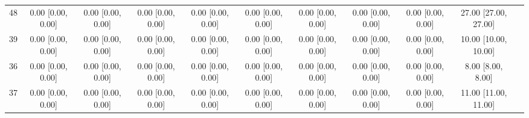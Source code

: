 \documentclass[8pt]{article}
\begin{document}
\begin{center}
\begin{footnotesize}
\begin{longtable}{|ccccccccccc|}
 48 &  0.00 [0.00, 0.00] &  0.00 [0.00, 0.00] &  0.00 [0.00, 0.00] &  0.00 [0.00, 0.00] &  0.00 [0.00, 0.00] &     0.00 [0.00, 0.00] &     0.00 [0.00, 0.00] &        0.00 [0.00, 0.00] &     27.00 [27.00, 27.00] \\
 39 &  0.00 [0.00, 0.00] &  0.00 [0.00, 0.00] &  0.00 [0.00, 0.00] &  0.00 [0.00, 0.00] &  0.00 [0.00, 0.00] &     0.00 [0.00, 0.00] &     0.00 [0.00, 0.00] &        0.00 [0.00, 0.00] &     10.00 [10.00, 10.00] \\
 36 &  0.00 [0.00, 0.00] &  0.00 [0.00, 0.00] &  0.00 [0.00, 0.00] &  0.00 [0.00, 0.00] &  0.00 [0.00, 0.00] &     0.00 [0.00, 0.00] &     0.00 [0.00, 0.00] &        0.00 [0.00, 0.00] &        8.00 [8.00, 8.00] \\
 37 &  0.00 [0.00, 0.00] &  0.00 [0.00, 0.00] &  0.00 [0.00, 0.00] &  0.00 [0.00, 0.00] &  0.00 [0.00, 0.00] &     0.00 [0.00, 0.00] &     0.00 [0.00, 0.00] &        0.00 [0.00, 0.00] &     11.00 [11.00, 11.00] \\
\end{longtable}
\end{footnotesize}
\end{center}
\end{document}

